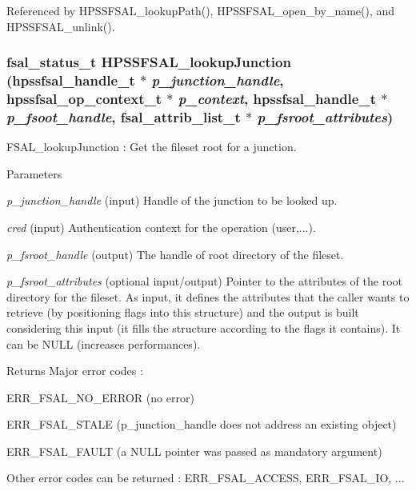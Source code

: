 Referenced by HPSSFSAL\_\-lookupPath(), HPSSFSAL\_\-open\_\-by\_\-name(), and HPSSFSAL\_\-unlink().
\subsubsection[{HPSSFSAL\_\-lookupJunction}]{\setlength{\rightskip}{0pt plus 5cm}fsal\_\-status\_\-t HPSSFSAL\_\-lookupJunction (hpssfsal\_\-handle\_\-t $\ast$ {\em p\_\-junction\_\-handle}, \/  hpssfsal\_\-op\_\-context\_\-t $\ast$ {\em p\_\-context}, \/  hpssfsal\_\-handle\_\-t $\ast$ {\em p\_\-fsoot\_\-handle}, \/  fsal\_\-attrib\_\-list\_\-t $\ast$ {\em p\_\-fsroot\_\-attributes})}\label{fsal__lookup_8c_a5eda6b1eecfd01b292ba931c73e5f4d8}
FSAL\_\-lookupJunction : Get the fileset root for a junction.


\begin{DoxyParams}{Parameters}
\item[{\em p\_\-junction\_\-handle}](input) Handle of the junction to be looked up. \item[{\em cred}](input) Authentication context for the operation (user,...). \item[{\em p\_\-fsroot\_\-handle}](output) The handle of root directory of the fileset. \item[{\em p\_\-fsroot\_\-attributes}](optional input/output) Pointer to the attributes of the root directory for the fileset. As input, it defines the attributes that the caller wants to retrieve (by positioning flags into this structure) and the output is built considering this input (it fills the structure according to the flags it contains). It can be NULL (increases performances).\end{DoxyParams}
\begin{DoxyReturn}{Returns}
Major error codes :
\begin{DoxyItemize}
\item ERR\_\-FSAL\_\-NO\_\-ERROR (no error)
\item ERR\_\-FSAL\_\-STALE (p\_\-junction\_\-handle does not address an existing object)
\item ERR\_\-FSAL\_\-FAULT (a NULL pointer was passed as mandatory argument)
\item Other error codes can be returned : ERR\_\-FSAL\_\-ACCESS, ERR\_\-FSAL\_\-IO, ... 
\end{DoxyItemize}
\end{DoxyReturn}


